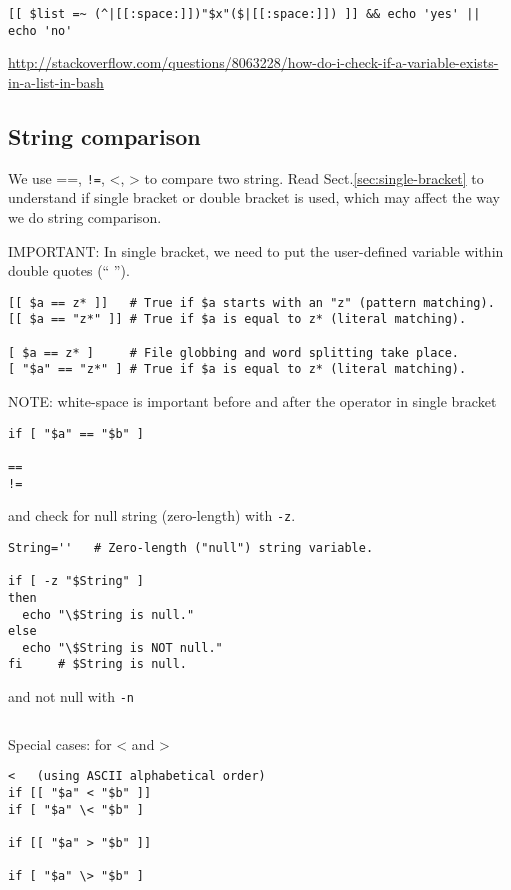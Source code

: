 \begin{verbatim}
[[ $list =~ (^|[[:space:]])"$x"($|[[:space:]]) ]] && echo 'yes' || echo 'no' 
\end{verbatim}

\url{http://stackoverflow.com/questions/8063228/how-do-i-check-if-a-variable-exists-in-a-list-in-bash}

\subsection{String comparison}

We use ==, \verb.!=., <, > to compare two string. 
Read Sect.\ref{sec:single-bracket} to understand if single bracket or double
bracket is used, which may affect the way we do string comparison.

IMPORTANT: In single bracket, we need to put the user-defined variable within
double quotes (`` '').

\begin{verbatim}
[[ $a == z* ]]   # True if $a starts with an "z" (pattern matching).
[[ $a == "z*" ]] # True if $a is equal to z* (literal matching).

[ $a == z* ]     # File globbing and word splitting take place.
[ "$a" == "z*" ] # True if $a is equal to z* (literal matching).
\end{verbatim}


NOTE: white-space is important before and after the operator in single bracket
\begin{verbatim}
if [ "$a" == "$b" ]

== 
!=
\end{verbatim}
and check for null string (zero-length) with \verb!-z!. 
\begin{verbatim}
String=''   # Zero-length ("null") string variable.

if [ -z "$String" ]
then
  echo "\$String is null."
else
  echo "\$String is NOT null."
fi     # $String is null.
\end{verbatim}
and not null with \verb!-n!
\begin{verbatim}

\end{verbatim}

Special cases: for < and >
\begin{verbatim}
<   (using ASCII alphabetical order)
if [[ "$a" < "$b" ]]
if [ "$a" \< "$b" ]

if [[ "$a" > "$b" ]]

if [ "$a" \> "$b" ]
\end{verbatim}




